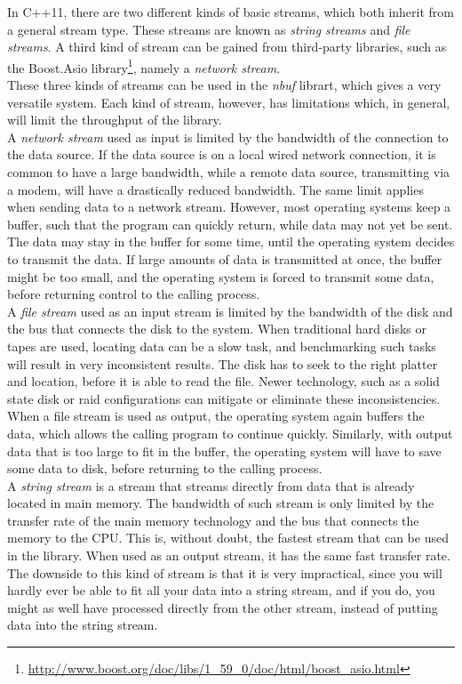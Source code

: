 \documentclass[a4paper]{article}
\newcommand{\nbuf}{\textit{nbuf} }
\begin{document}
In C++11, there are two different kinds of basic streams, which both inherit from a general stream type. These streams are known as \textit{string streams} and \textit{file streams}. A third kind of stream can be gained from third-party libraries, such as the Boost.Asio library\footnote{ \url{http://www.boost.org/doc/libs/1\_59\_0/doc/html/boost\_asio.html}}, namely a \textit{network stream}.\\

These three kinds of streams can be used in the \nbuf librart, which gives a very versatile system. Each kind of stream, however, has limitations which, in general, will limit the throughput of the library.\\

A \textit{network stream} used as input is limited by the bandwidth of the connection to the data source. If the data source is on a local wired network connection, it is common to have a large bandwidth, while a remote data source, transmitting via a modem, will have a drastically reduced bandwidth. The same limit applies when sending data to a network stream. However, most operating systems keep a buffer, such that the program can quickly return, while data may not yet be sent. The data may stay in the buffer for some time, until the operating system decides to transmit the data. If large amounts of data is transmitted at once, the buffer might be too small, and the operating system is forced to transmit some data, before returning control to the calling process.\\

A \textit{file stream} used as an input stream is limited by the bandwidth of the disk and the bus that connects the disk to the system. When traditional hard disks or tapes are used, locating data can be a slow task, and benchmarking such tasks will result in very inconsistent results. The disk has to seek to the right platter and location, before it is able to read the file. Newer technology, such as a solid state disk or raid configurations can mitigate or eliminate these inconsistencies. When a file stream is used as output, the operating system again buffers the data, which allows the calling program to continue quickly. Similarly, with output data that is too large to fit in the buffer, the operating system will have to save some data to disk, before returning to the calling process.\\

A \textit{string stream} is a stream that streams directly from data that is already located in main memory. The bandwidth of such stream is only limited by the transfer rate of the main memory technology and the bus that connects the memory to the CPU. This is, without doubt, the fastest stream that can be used in the library. When used as an output stream, it has the same fast transfer rate. The downside to this kind of stream is that it is very impractical, since you will hardly ever be able to fit all your data into a string stream, and if you do, you might as well have processed directly from the other stream, instead of putting data into the string stream.\\
\end{document}
